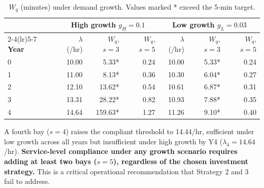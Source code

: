 \documentclass[10pt,a4paper]{article}
\begin{document}
\begin{table}[H]
    \centering
    \caption{$W_q$ (minutes) under demand growth. Values marked * exceed the 5-min target.}
    \label{tab:queueing}
    \small
    \begin{tabular}{@{}lrrrrrr@{}}
        \toprule
                      & \multicolumn{3}{c}{\textbf{High growth} $g_H=0.1$} & \multicolumn{3}{c}{\textbf{Low growth} $g_L=0.03$}                                                                      \\
        \cmidrule(lr){2-4}\cmidrule(lr){5-7}
        \textbf{Year} & $\lambda$ (/hr)                                    & $W_q$, $s{=}3$                                     & $W_q$, $s{=}5$ & $\lambda$ (/hr) & $W_q$, $s{=}3$ & $W_q$, $s{=}5$ \\
        \midrule
        0             & 10.00                                              & 5.33*                                              & 0.24           & 10.00           & 5.33*          & 0.24           \\
        1             & 11.00                                              & 8.13*                                              & 0.36           & 10.30           & 6.04*          & 0.27           \\
        2             & 12.10                                              & 13.62*                                             & 0.54           & 10.61           & 6.87*          & 0.31           \\
        3             & 13.31                                              & 28.22*                                             & 0.82           & 10.93           & 7.88*          & 0.35           \\
        4             & 14.64                                              & 159.63*                                            & 1.27           & 11.26           & 9.10*          & 0.40           \\
        \bottomrule
    \end{tabular}
\end{table}

A fourth bay ($s = 4$) raises the compliant threshold to 14.44/hr, sufficient under low growth across all years but insufficient under high growth by Y4 ($\lambda_4 = 14.64$/hr). \textbf{Service-level compliance under any growth scenario requires adding at least two bays ($s = 5$), regardless of the chosen investment strategy.} This is a critical operational recommendation that Strategy 2 and 3 fail to address.
\end{document}
